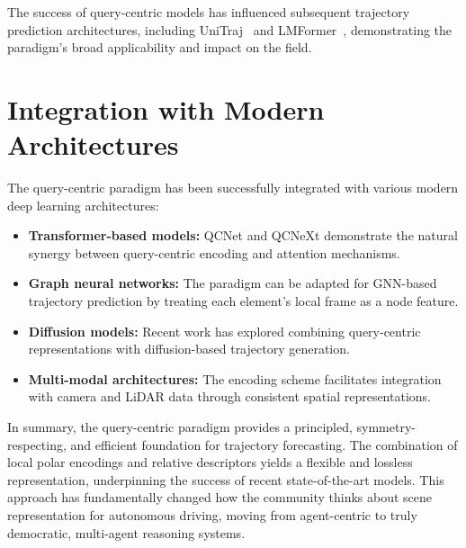 The success of query-centric models has influenced subsequent trajectory prediction architectures, including UniTraj~\cite{unitrajFeng2024} and LMFormer~\cite{lmformerYadav2025}, demonstrating the paradigm's broad applicability and impact on the field.

\section{Integration with Modern Architectures}
The query-centric paradigm has been successfully integrated with various modern deep learning architectures:

\begin{itemize}
    \item \textbf{Transformer-based models:} QCNet and QCNeXt demonstrate the natural synergy between query-centric encoding and attention mechanisms.
    \item \textbf{Graph neural networks:} The paradigm can be adapted for GNN-based trajectory prediction by treating each element's local frame as a node feature.
    \item \textbf{Diffusion models:} Recent work has explored combining query-centric representations with diffusion-based trajectory generation.
    \item \textbf{Multi-modal architectures:} The encoding scheme facilitates integration with camera and LiDAR data through consistent spatial representations.
\end{itemize}

In summary, the query-centric paradigm provides a principled, symmetry-respecting, and efficient foundation for trajectory forecasting. The combination of local polar encodings and relative descriptors yields a flexible and lossless representation, underpinning the success of recent state-of-the-art models. This approach has fundamentally changed how the community thinks about scene representation for autonomous driving, moving from agent-centric to truly democratic, multi-agent reasoning systems.